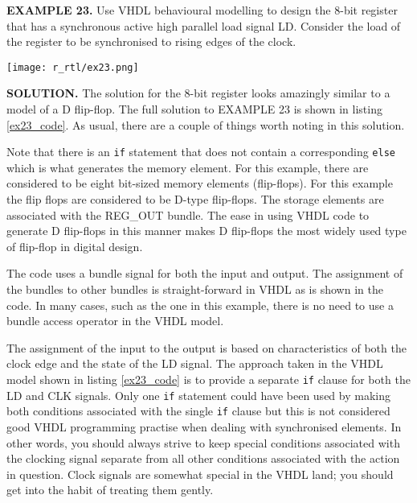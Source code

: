 \begin{leftbar}
\begin{minipage}[t]{0.52\textwidth}
\vspace{10pt}
\noindent
\textbf{EXAMPLE 23.}
Use VHDL behavioural modelling to design the 8-bit register that has a synchronous active high parallel load signal LD. Consider the load of the register to be synchronised to rising edges of the clock. 
\end{minipage}
\begin{minipage}[t]{0.47\textwidth}
\vspace{0pt}\raggedright
    \centering
	\texttt{[image: r\_rtl/ex23.png]}
\end{minipage}
\end{leftbar}
\noindent
\textbf{SOLUTION.} The solution for the 8-bit register looks amazingly similar to a model of a D flip-flop. The full solution to EXAMPLE 23 is shown in listing \ref{ex23_code}. As usual, there are a couple of things worth noting in this solution.
\begin{my_list}
\item Note that there is an \texttt{if} statement that does not contain a corresponding \texttt{else} which is what generates the memory element. For this example, there are considered to be eight bit-sized memory elements (flip-flops). For this example the flip flops are considered to be D-type flip-flops. The storage elements are associated with the REG\_OUT bundle. The ease in using VHDL code to generate D flip-flops in this manner makes D flip-flops the most widely used type of flip-flop in digital design.

\item The code uses a bundle signal for both the input and output. The assignment of the bundles to other bundles is straight-forward in VHDL as is shown in the code. In many cases, such as the one in this example, there is no need to use a bundle access operator in the VHDL model. 

\item The assignment of the input to the output is based on characteristics of both the clock edge and the state of the LD signal. The approach taken in the VHDL model shown in listing \ref{ex23_code} is to provide a separate \texttt{if} clause for both the LD and CLK signals. Only one \texttt{if} statement could have been used by making both conditions associated with the single \texttt{if} clause but this is not considered good VHDL programming practise when dealing with synchronised elements. In other words, you should always strive to keep special conditions associated with the clocking signal separate from all other conditions associated with the action in question. Clock signals are somewhat special in the VHDL land; you should get into the habit of treating them gently. 
\end{my_list}

